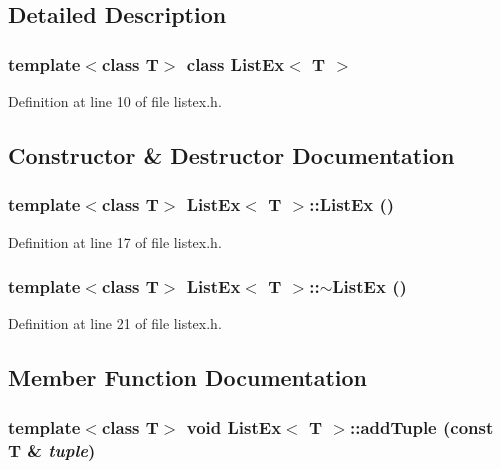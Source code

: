 \subsection{Detailed Description}
\subsubsection*{template$<$class T$>$ class ListEx$<$ T $>$}



Definition at line 10 of file listex.h.

\subsection{Constructor \& Destructor Documentation}
\hypertarget{classListEx_e4072096112038fb9c1c764765e33183}{
\subsubsection[{ListEx}]{\setlength{\rightskip}{0pt plus 5cm}template$<$class T$>$ {\bf ListEx}$<$ T $>$::{\bf ListEx} ()}}
\label{classListEx_e4072096112038fb9c1c764765e33183}




Definition at line 17 of file listex.h.\hypertarget{classListEx_2ad75ad4eb5e4c3fcc8ea98bcbd2fc5e}{
\subsubsection[{$\sim$ListEx}]{\setlength{\rightskip}{0pt plus 5cm}template$<$class T$>$ {\bf ListEx}$<$ T $>$::$\sim${\bf ListEx} ()}}
\label{classListEx_2ad75ad4eb5e4c3fcc8ea98bcbd2fc5e}




Definition at line 21 of file listex.h.

\subsection{Member Function Documentation}
\hypertarget{classListEx_14006a0f7481d9849d1c77950e8a0b2a}{
\subsubsection[{addTuple}]{\setlength{\rightskip}{0pt plus 5cm}template$<$class T$>$ void {\bf ListEx}$<$ T $>$::addTuple (const T \& {\em tuple})}}
\label{classListEx_14006a0f7481d9849d1c77950e8a0b2a}




